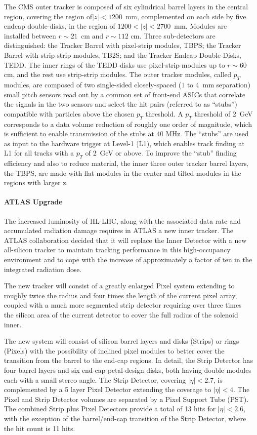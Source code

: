 The CMS outer tracker is composed of six cylindrical barrel layers in the central region, covering the region of$|z| < 1200$~mm, complemented on each side by five endcap double-disks, in
the region of $1200 < |z| < 2700$~mm. Modules are installed between $r\sim21$~cm and $r\sim112$ cm. Three sub-detectors are distinguished: the Tracker Barrel with pixel-strip modules, TBPS; the Tracker Barrel with strip-strip modules, TB2S; and the Tracker Endcap
Double-Disks, TEDD. The inner rings of the TEDD disks use pixel-strip modules up to $r\sim 60$ cm, and the rest use strip-strip modules.
The outer tracker modules, called $p_T$ modules, are composed of two single-sided closely-spaced ($1$ to $4$~mm separation) small pitch sensors read out by a common set of front-end ASICs that correlate the signals in the two sensors and select the hit pairs (referred to as ``stubs”) compatible with particles above the chosen $p_T$ threshold. A $p_T$ threshold of $2$~GeV corresponds to a data volume reduction of roughly one order of magnitude, which is sufficient to enable transmission of the stubs at 40 MHz.
The ``stubs'' are used as input to the hardware trigger at Level-1 (L1), which enables track finding at L1 for all tracks with a $p_T$ of $2$~GeV or above. 
To improve the ``stub'' finding efficiency and also to reduce material, the inner three outer tracker barrel layers, the TBPS, are made with flat modules in the center and tilted modules in the regions with larger z. 

\paragraph{ATLAS Upgrade}
The increased luminosity of HL-LHC, along with the associated data rate and accumulated radiation damage requires in ATLAS a new inner tracker. 
The ATLAS collaboration decided that it will replace the Inner Detector with a new all-silicon tracker to maintain tracking performance in
this high-occupancy environment and to cope with the increase of approximately a factor
of ten in the integrated radiation dose.

The new tracker will consist of a greatly enlarged
Pixel system extending to roughly twice the radius and four times the length of the current
pixel array, coupled with a much more segmented strip detector requiring over three
times the silicon area of the current detector to cover the full radius of the solenoid inner.

The new system will consist of silicon barrel layers and disks (Strips) or rings
(Pixels) with the possibility of inclined pixel modules to better cover the transition from
the barrel to the end-cap regions.
In detail, the Strip Detector has four barrel layers and six end-cap petal-design disks, both having double modules each with a small stereo angle.
The Strip Detector, covering $|\eta|< 2.7$,
is complemented by a 5 layer Pixel Detector extending the coverage to $|\eta |< 4$. The Pixel
and Strip Detector volumes are separated by a Pixel Support Tube (PST).
The combined Strip plus Pixel Detectors provide a total of 13 hits for $|\eta| < 2.6$, with
the exception of the barrel/end-cap transition of the Strip Detector, where the hit count is 11 hits.

